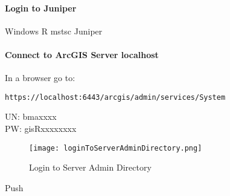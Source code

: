 \paragraph{Login to Juniper}

\noindent Windows R  {\rtArrow}  mstsc {\rtArrow} Juniper

\paragraph{Connect to ArcGIS Server localhost}

\noindent In a browser go to:

\begin{verbatim}
https://localhost:6443/arcgis/admin/services/System
\end{verbatim} 
UN: bmaxxxx\\
PW: gisRxxxxxxxx\\
{\bigbtn{}}
 \begin{figure}[h!]
 \centering
     \texttt{[image: loginToServerAdminDirectory.png]}
\vspace{-.7in} 
 \caption{Login to Server Admin Directory}
 \end{figure}

{\bigbtn Push }

\clearpage
%
%

